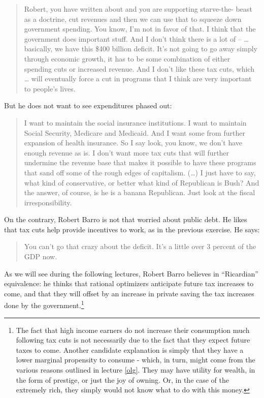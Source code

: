 \documentclass[]{book}
\let\rmarkdownfootnote\footnote%
\def\footnote{\protect\rmarkdownfootnote}
\begin{document}
\begin{quote}
Robert, you have written about and you are supporting starve-the- beast
as a doctrine, cut revenues and then we can use that to squeeze down
government spending. You know, I'm not in favor of that. I think that
the government does important stuff. And I don't think there is a lot of
-- \ldots{} basically, we have this \$400 billion deficit. It's not
going to go away simply through economic growth, it has to be some
combination of either spending cuts or increased revenue. And I don't
like these tax cuts, which \ldots{} will eventually force a cut in
programs that I think are very important to people's lives.
\end{quote}

But he does not want to see expenditures phased out:

\begin{quote}
I want to maintain the social insurance institutions. I want to maintain
Social Security, Medicare and Medicaid. And I want some from further
expansion of health insurance. So I say look, you know, we don't have
enough revenue as is. I don't want more tax cuts that will further
undermine the revenue base that makes it possible to have these programs
that sand off some of the rough edges of capitalism. (\ldots{}) I just
have to say, what kind of conservative, or better what kind of
Republican is Bush? And the answer, of course, is he is a banana
Republican. Just look at the fiscal irresponsibility.
\end{quote}

On the contrary, Robert Barro is not that worried about public debt. He
likes that tax cuts help provide incentives to work, as in the previous
exercise. He says:

\begin{quote}
You can't go that crazy about the deficit. It's a little over 3 percent
of the GDP now.
\end{quote}

As we will see during the following lectures, Robert Barro believes in
``Ricardian'' equivalence: he thinks that rational optimizers anticipate
future tax increases to come, and that they will offset by an increase
in private saving the tax increases done by the government.\footnote{The
  fact that high income earners do not increase their consumption much
  following tax cuts is not necessarily due to the fact that they expect
  future taxes to come. Another candidate explanation is simply that
  they have a lower marginal propensity to consume - which, in turn,
  might come from the various reasons outlined in lecture \ref{olg}.
  They may have utility for wealth, in the form of prestige, or just the
  joy of owning. Or, in the case of the extremely rich, they simply
  would not know what to do with this money.}
\end{document}
